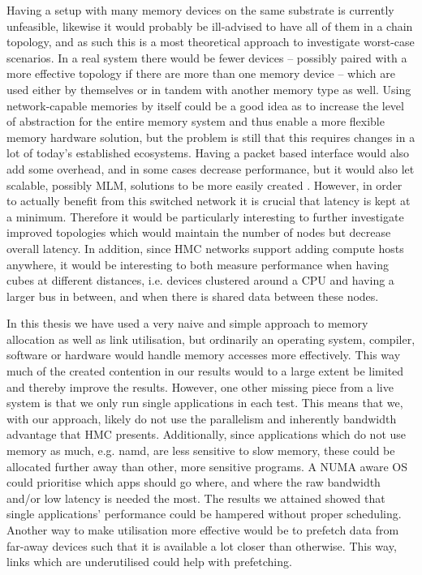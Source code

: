 Having a setup with many memory devices on the same substrate is currently unfeasible, likewise it would probably be ill-advised to have all of them in a chain topology, and as such this is a most theoretical approach to investigate worst-case scenarios. In a real system there would be fewer devices -- possibly paired with a more effective topology if there are more than one memory device -- which are used either by themselves or in tandem with another memory type as well. Using network-capable memories by itself could be a good idea as to increase the level of abstraction for the entire memory system and thus enable a more flexible memory hardware solution, but the problem is still that this requires changes in a lot of today's established ecosystems. Having a packet based interface would also add some overhead, and in some cases decrease performance, but it would also let scalable, possibly MLM, solutions to be more easily created \cite{8167757}. However, in order to actually benefit from this switched network it is crucial that latency is kept at a minimum. Therefore it would be particularly interesting to further investigate improved topologies which would maintain the number of nodes but decrease overall latency. In addition, since HMC networks support adding compute hosts anywhere, it would be interesting to both measure performance when having cubes at different distances, i.e. devices clustered around a CPU and having a larger bus in between, and when there is shared data between these nodes.
\bigskip

In this thesis we have used a very naive and simple approach to memory allocation as well as link utilisation, but ordinarily an operating system, compiler, software or hardware would handle memory accesses more effectively. This way much of the created contention in our results would to a large extent be limited and thereby improve the results. However, one other missing piece from a live system is that we only run single applications in each test. This means that we, with our approach, likely do not use the parallelism and inherently bandwidth advantage that HMC presents. Additionally, since applications which do not use memory as much, e.g. namd, are less sensitive to slow memory, these could be allocated further away than other, more sensitive programs. A NUMA aware OS could prioritise which apps should go where, and where the raw bandwidth and/or low latency is needed the most. The results we attained showed that single applications' performance could be hampered without proper scheduling. Another way to make utilisation more effective would be to prefetch data from far-away devices such that it is available a lot closer than otherwise. This way, links which are underutilised could help with prefetching. 
\bigskip

